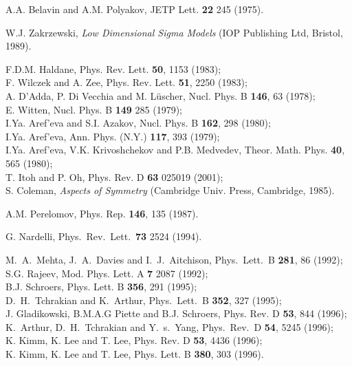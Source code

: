 \documentclass[a4paper,12pt]{article}
\begin{document}
\begin{thebibliography}{99}

 A.A. Belavin and A.M. Polyakov, JETP Lett. {\bf 22} 245 (1975).

 W.J. Zakrzewski, {\it Low Dimensional Sigma Models}
(IOP Publishing Ltd, Bristol, 1989).

 F.D.M. Haldane, Phys. Rev. Lett. {\bf 50}, {1153} (1983);\\
F. Wilczek and A. Zee, Phys. Rev. Lett. {\bf 51}, 2250 (1983);\\  A. D'Adda, P. Di Vecchia and M. L\"uscher, Nucl.
Phys. B {\bf 146}, 63 (1978);\\ E. Witten, Nucl. Phys. B {\bf 149} 285 (1979);\\ I.Ya. Aref'eva and S.I. Azakov,
Nucl. Phys. B {\bf 162}, 298 (1980);\\ I.Ya. Aref'eva, Ann. Phys. (N.Y.) {\bf 117}, 393 (1979);\\ I.Ya. Aref'eva,
V.K. Krivoshchekov and P.B. Medvedev, Theor. Math. Phys. {\bf 40}, 565 (1980);\\
 T. Itoh and P. Oh, Phys. Rev. D {\bf 63} {025019} (2001);\\
S. Coleman, {\it Aspects of Symmetry}
(Cambridge Univ. Press, Cambridge, 1985).

 A.M. Perelomov, Phys. Rep. {\bf 146}, 135 (1987).



 G. Nardelli, Phys.\ Rev.\ Lett.\ {\bf 73} 2524 (1994).

M.~A.~Mehta, J.~A.~Davies and I.~J.~Aitchison,
Phys.\ Lett.\ B {\bf 281}, 86 (1992);\\
S.G. Rajeev, Mod. Phys. Lett. A {\bf 7} 2087 (1992);\\
B.J. Schroers, Phys. Lett. B {\bf 356}, 291 (1995);\\
D.~H.~Tchrakian and K.~Arthur,
Phys.\ Lett.\ B {\bf 352}, 327 (1995);\\
J. Gladikowski, B.M.A.G Piette and B.J. Schroers,
Phys. Rev. D {\bf 53}, 844 (1996);\\
K.~Arthur, D.~H.~Tchrakian and Y.~s.~Yang,
Phys.\ Rev.\ D {\bf 54}, 5245 (1996);\\
K. Kimm, K. Lee and  T. Lee, Phys. Rev. D {\bf 53}, 4436 (1996);\\ K. Kimm, K. Lee and  T. Lee, Phys. Lett. B {\bf 380}, 303 (1996).


\end{thebibliography}
\end{document}
